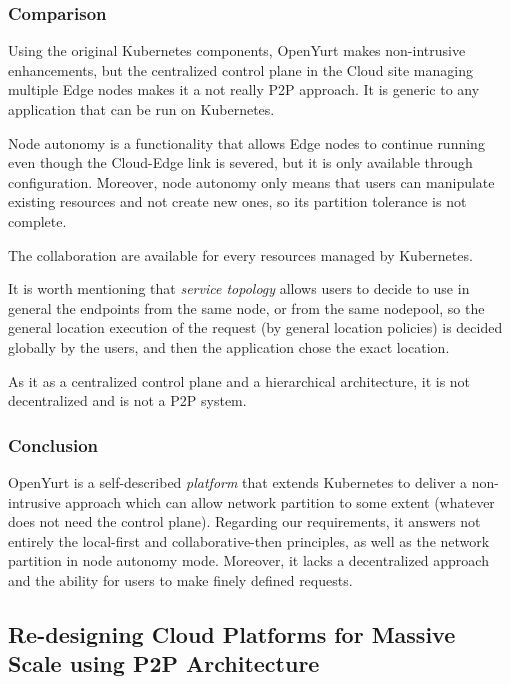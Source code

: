 \subsubsection*{Comparison}

Using the original Kubernetes components, OpenYurt makes non-intrusive
enhancements, but the centralized control plane in the Cloud site
managing multiple Edge nodes makes it a not really \acrshort{P2P} approach.
%
It is generic to any application that can be run on Kubernetes.

%
Node autonomy is a functionality that allows Edge nodes to continue
running even though the Cloud-Edge link is severed, but it is only
available through configuration.
%
Moreover, node autonomy only means that users can manipulate existing
resources and not create new ones, so its partition tolerance is not
complete.

The collaboration are available for every resources managed by
Kubernetes.

%
It is worth mentioning that \emph{service topology} allows users to
decide to use in general the endpoints from the same node, or from the
same nodepool, so the general location execution of the request (by
general location policies) is decided globally by the users, and then
the application chose the exact location.

As it as a centralized control plane and a hierarchical architecture,
it is not decentralized and is not a \acrshort{P2P} system.

\subsubsection*{Conclusion}

OpenYurt is a self-described \emph{platform} that extends Kubernetes
to deliver a non-intrusive approach which can allow network partition
to some extent (\ie whatever does not need the control plane).
%
Regarding our requirements, it answers not entirely the local-first
and collaborative-then principles, as well as the network partition in
node autonomy mode.
%
Moreover, it lacks a decentralized approach and the ability for users
to make finely defined requests.



\subsection{Re-designing Cloud Platforms for Massive Scale using \acrshort{P2P}
  Architecture~\cite{SYHJ17}}
\label{subsec:SYHJ17}

